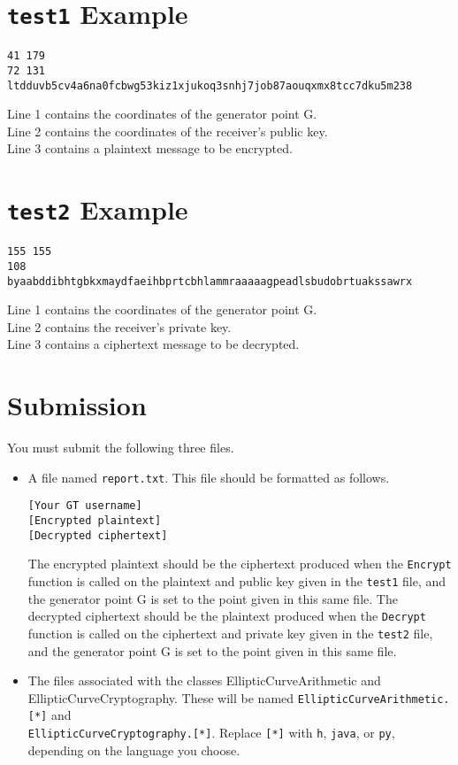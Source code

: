 \documentclass[12pt, letterpaper]{article}
\begin{document}
\section*{\texttt{test1} Example}
\begin{verbatim}
41 179
72 131
ltdduvb5cv4a6na0fcbwg53kiz1xjukoq3snhj7job87aouqxmx8tcc7dku5m238
\end{verbatim}
Line 1 contains the coordinates of the generator point G.\\
Line 2 contains the coordinates of the receiver's public key.\\
Line 3 contains a plaintext message to be encrypted.

\section*{\texttt{test2} Example}
\begin{verbatim}
155 155
108
byaabddibhtgbkxmaydfaeihbprtcbhlammraaaaagpeadlsbudobrtuakssawrx
\end{verbatim}
Line 1 contains the coordinates of the generator point G.\\
Line 2 contains the receiver's private key.\\
Line 3 contains a ciphertext message to be decrypted.

\section*{Submission}
You must submit the following three files.
\begin{itemize}
    \item A file named \texttt{report.txt}. This file should be formatted as follows.
    \begin{verbatim}
[Your GT username]
[Encrypted plaintext]
[Decrypted ciphertext]
    \end{verbatim}
    The encrypted plaintext should be the ciphertext produced when the \texttt{Encrypt} function is called on the plaintext and public key given in the \texttt{test1} file, and the generator point G is set to the point given in this same file. The decrypted ciphertext should be the plaintext produced when the \texttt{Decrypt} function is called on the ciphertext and private key given in the \texttt{test2} file, and the generator point G is set to the point given in this same file.
    
    \item The files associated with the classes EllipticCurveArithmetic and EllipticCurveCryptography. These will be named \texttt{EllipticCurveArithmetic.[*]} and\\ \texttt{EllipticCurveCryptography.[*]}. Replace \texttt{[*]} with \texttt{h}, \texttt{java}, or \texttt{py}, depending on the language you choose.
\end{itemize}

\printbibliography
\end{document}
